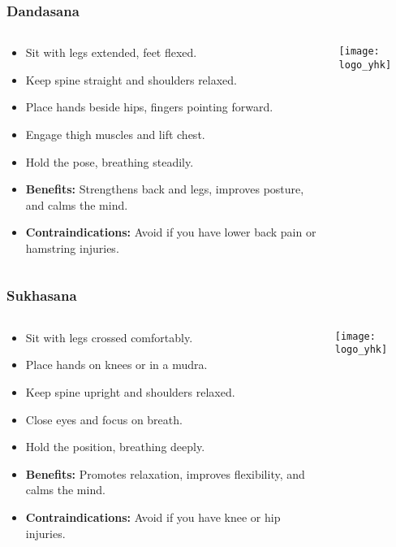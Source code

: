 \begin{frame}[fragile]\frametitle{Dandasana}
\begin{columns}
    \begin{column}[T]{0.5\linewidth}
      \begin{itemize}
        \item Sit with legs extended, feet flexed.
        \item Keep spine straight and shoulders relaxed.
        \item Place hands beside hips, fingers pointing forward.
        \item Engage thigh muscles and lift chest.
        \item Hold the pose, breathing steadily.
        \item \textbf{Benefits:} Strengthens back and legs, improves posture, and calms the mind.
        \item \textbf{Contraindications:} Avoid if you have lower back pain or hamstring injuries.
      \end{itemize}
    \end{column}
    \begin{column}[T]{0.5\linewidth}
        \begin{center}
        \texttt{[image: logo\_yhk]}
        \end{center}    
    \end{column}
  \end{columns}
\end{frame}

\begin{frame}[fragile]\frametitle{Sukhasana}
\begin{columns}
    \begin{column}[T]{0.5\linewidth}
      \begin{itemize}
        \item Sit with legs crossed comfortably.
        \item Place hands on knees or in a mudra.
        \item Keep spine upright and shoulders relaxed.
        \item Close eyes and focus on breath.
        \item Hold the position, breathing deeply.
        \item \textbf{Benefits:} Promotes relaxation, improves flexibility, and calms the mind.
        \item \textbf{Contraindications:} Avoid if you have knee or hip injuries.
      \end{itemize}
    \end{column}
    \begin{column}[T]{0.5\linewidth}
        \begin{center}
        \texttt{[image: logo\_yhk]}
        \end{center}    
    \end{column}
  \end{columns}
\end{frame}

